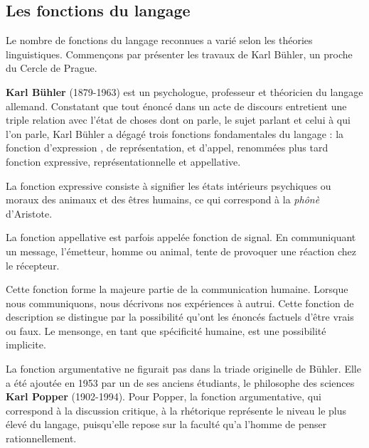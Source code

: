\subsection{Les fonctions du langage}
Le nombre de fonctions du langage reconnues a varié selon les théories linguistiques. Commençons par présenter les travaux de Karl Bühler, un proche du Cercle de Prague.

\textbf{Karl Bühler} (1879-1963) est un psychologue, professeur et théoricien du langage allemand. Constatant que tout énoncé dans un acte de discours entretient une triple relation avec l’état de choses dont on parle, le sujet parlant et celui à qui l’on parle, Karl Bühler a dégagé trois fonctions fondamentales du langage : la fonction d’expression , de représentation, et d’appel, renommées plus tard fonction expressive, représentationnelle et appellative.

La fonction expressive consiste à signifier les états intérieurs psychiques ou moraux des animaux et des êtres humains, ce qui correspond à la \textit{phônè} d’Aristote.

La fonction appellative est parfois appelée fonction de signal. En communiquant un message, l’émetteur, homme ou animal, tente de provoquer une réaction chez le récepteur.

Cette fonction forme la majeure partie de la communication humaine. Lorsque nous communiquons, nous décrivons nos expériences à autrui. Cette fonction de description se distingue par la possibilité qu’ont les énoncés factuels d’être vrais ou faux. Le mensonge, en tant que spécificité humaine, est une possibilité implicite.

La fonction argumentative ne figurait pas dans la triade originelle de Bühler. Elle a été ajoutée en 1953 par un de ses anciens étudiants, le philosophe des sciences \textbf{Karl Popper} (1902-1994). Pour Popper, la fonction argumentative, qui correspond à la discussion critique, à la rhétorique représente le niveau le plus élevé du langage, puisqu’elle repose sur la faculté qu’a l’homme de penser rationnellement.


